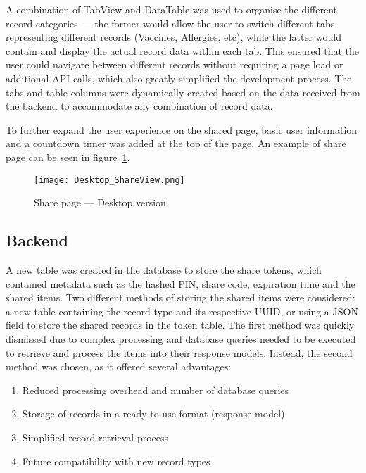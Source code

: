 A combination of TabView and DataTable was used to organise the different record categories --- the former would allow the user to switch different tabs representing different records (Vaccines, Allergies, etc), while the latter would contain and display the actual record data within each tab. This ensured that the user could navigate between different records without requiring a page load or additional API calls, which also greatly simplified the development process. The tabs and table columns were dynamically created based on the data received from the backend to accommodate any combination of record data.

To further expand the user experience on the shared page, basic user information and a countdown timer was added at the top of the page. An example of share page can be seen in figure~\ref{fig:share_page}.

\begin{figure}[htbp]
  \centering
  \texttt{[image: Desktop\_ShareView.png]}
  \caption{Share page --- Desktop version}\label{fig:share_page}
\end{figure}

\FloatBarrier{}

\subsection{Backend}

A new table was created in the database to store the share tokens, which contained metadata such as the hashed PIN, share code, expiration time and the shared items. Two different methods of storing the shared items were considered: a new table containing the record type and its respective UUID, or using a JSON field to store the shared records in the token table. The first method was quickly dismissed due to complex processing and database queries needed to be executed to retrieve and process the items into their response models. Instead, the second method was chosen, as it offered several advantages:

\begin{enumerate}
  \item Reduced processing overhead and number of database queries
  \item Storage of records in a ready-to-use format (response model)
  \item Simplified record retrieval process
  \item Future compatibility with new record types
\end{enumerate}

